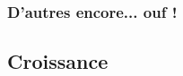 
\begin{frame}
\frametitle{\bf D'autres encore... ouf !} 
\medskip 

\qquad \qquad \grapheEXP \qquad \grapheEXPinv 

\qquad \qquad \grapheLN \qquad \grapheLNinv

\grapheSINH \qquad \grapheCOSH \qquad \grapheTANH

\end{frame}


\subsection{Croissance} 

